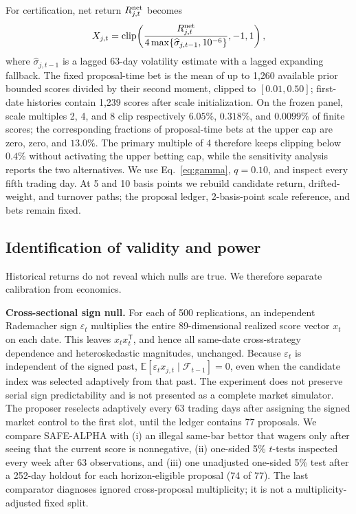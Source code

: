 For certification, net return \(R_{j,t}^{\rm net}\) becomes
\[
X_{j,t}=\operatorname{clip}\!\left(
\frac{R_{j,t}^{\rm net}}
{4\max\{\widehat\sigma_{j,t-1},10^{-6}\}},-1,1\right),
\]
where \(\widehat\sigma_{j,t-1}\) is a lagged 63-day volatility estimate with a
lagged expanding fallback.  The fixed proposal-time bet is the mean of up to
1,260 available prior bounded scores divided by their second moment, clipped
to \([0.01,0.50]\); first-date histories contain 1,239 scores after scale
initialization.  On the frozen panel, scale multiples 2, 4, and 8 clip
respectively \(6.05\%\), \(0.318\%\), and \(0.0099\%\) of finite scores; the
corresponding fractions of proposal-time bets at the upper cap are zero,
zero, and \(13.0\%\).  The primary multiple of 4 therefore keeps clipping
below \(0.4\%\) without activating the upper betting cap, while the sensitivity
analysis reports the two alternatives.  We use Eq.~\eqref{eq:gamma},
\(q=0.10\), and inspect every
fifth trading day.  At 5 and 10 basis points we rebuild candidate return,
drifted-weight, and turnover paths; the proposal ledger, 2-basis-point scale
reference, and bets remain fixed.

\subsection{Identification of validity and power}

Historical returns do not reveal which nulls are true.  We therefore separate
calibration from economics.

\textbf{Cross-sectional sign null.}
For each of 500 replications, an independent Rademacher sign
\(\varepsilon_t\) multiplies the entire 89-dimensional realized score vector
\(x_t\) on each date.  This leaves \(x_tx_t^\mathsf T\), and hence all
same-date cross-strategy dependence and heteroskedastic magnitudes, unchanged.
Because \(\varepsilon_t\) is independent of the signed past,
\(\mathbb E[\varepsilon_tx_{j,t}\mid\mathcal F_{t-1}]=0\), even when the
candidate index was selected adaptively from that past.  The experiment does
not preserve serial sign predictability and is not presented as a complete
market simulator.  The proposer reselects adaptively
every 63 trading days after assigning the signed market control to the first
slot, until the ledger contains 77 proposals.  We compare SAFE-ALPHA with
(i) an illegal same-bar bettor that wagers only after seeing that the current
score is nonnegative, (ii) one-sided 5\% \(t\)-tests inspected every week
after 63 observations, and (iii) one unadjusted one-sided 5\% test after a
252-day holdout for each horizon-eligible proposal (74 of 77).  The last
comparator diagnoses ignored cross-proposal multiplicity; it is not a
multiplicity-adjusted fixed split.

